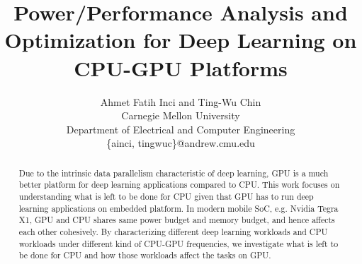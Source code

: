 \documentclass[times, 10pt,twocolumn]{article}
\begin{document}
\title{Power/Performance Analysis and Optimization for Deep Learning on CPU-GPU Platforms}

\author{Ahmet Fatih Inci and Ting-Wu Chin  \\
Carnegie Mellon University\\ Department of Electrical and Computer Engineering \\ \{ainci, tingwuc\}@andrew.cmu.edu\\
}
\maketitle
\thispagestyle{empty}

\begin{abstract}
    Due to the intrinsic data parallelism characteristic of deep learning, GPU is a much better platform for deep learning applications compared to CPU. This work focuses on understanding what is left to be done for CPU given that GPU has to run deep learning applications on embedded platform. In modern mobile SoC, e.g. Nvidia Tegra X1, GPU and CPU shares same power budget and memory budget, and hence affects each other cohesively. By characterizing different deep learning workloads and CPU workloads under different kind of CPU-GPU frequencies, we investigate what is left to be done for CPU and how those workloads affect the tasks on GPU. 

\end{abstract}






%




\end{document}
